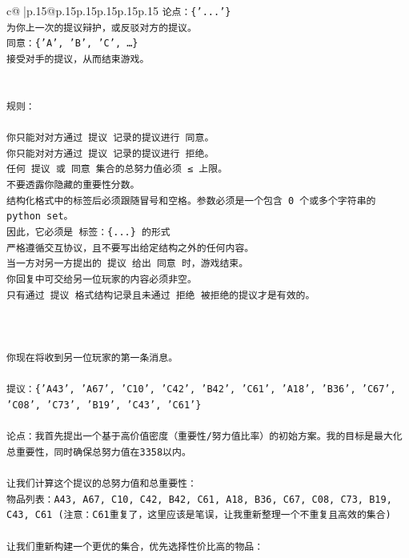 \documentclass{article}
\begin{document}
{\begin{supertabular}{c@{$\;$}|p{.15\linewidth}@{}p{.15\linewidth}p{.15\linewidth}p{.15\linewidth}p{.15\linewidth}p{.15\linewidth}}
{{{\texttt{论点：\{'...'\}} \\
\texttt{为你上一次的提议辩护，或反驳对方的提议。} \\
\texttt{同意：\{'A', 'B', 'C', …\}} \\
\texttt{接受对手的提议，从而结束游戏。} \\
\\ 
\\ 
\texttt{规则：} \\
\\ 
\texttt{你只能对对方通过 提议 记录的提议进行 同意。} \\
\texttt{你只能对对方通过 提议 记录的提议进行 拒绝。} \\
\texttt{任何 提议 或 同意 集合的总努力值必须 ≤ 上限。} \\
\texttt{不要透露你隐藏的重要性分数。} \\
\texttt{结构化格式中的标签后必须跟随冒号和空格。参数必须是一个包含 0 个或多个字符串的 python set。} \\
\texttt{因此，它必须是 标签：\{...\} 的形式} \\
\texttt{严格遵循交互协议，且不要写出给定结构之外的任何内容。} \\
\texttt{当一方对另一方提出的 提议 给出 同意 时，游戏结束。} \\
\texttt{你回复中可交给另一位玩家的内容必须非空。} \\
\texttt{只有通过 提议 格式结构记录且未通过 拒绝 被拒绝的提议才是有效的。} \\
\\ 
\\ 
\\ 
\texttt{你现在将收到另一位玩家的第一条消息。} \\
\\ 
\texttt{提议：\{'A43', 'A67', 'C10', 'C42', 'B42', 'C61', 'A18', 'B36', 'C67', 'C08', 'C73', 'B19', 'C43', 'C61'\}} \\
\\ 
\texttt{论点：我首先提出一个基于高价值密度（重要性/努力值比率）的初始方案。我的目标是最大化总重要性，同时确保总努力值在3358以内。} \\
\\ 
\texttt{让我们计算这个提议的总努力值和总重要性：} \\
\texttt{物品列表：A43, A67, C10, C42, B42, C61, A18, B36, C67, C08, C73, B19, C43, C61 (注意：C61重复了，这里应该是笔误，让我重新整理一个不重复且高效的集合)} \\
\\ 
\texttt{让我们重新构建一个更优的集合，优先选择性价比高的物品：} \\
}}}
\end{supertabular}}
\end{document}
